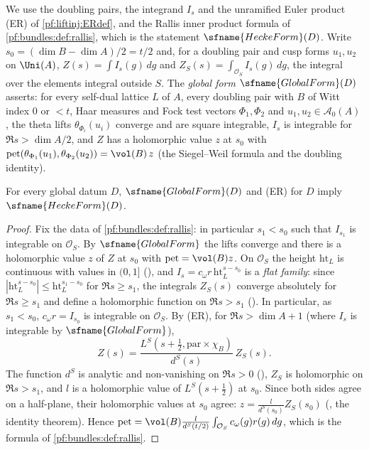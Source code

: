 We use the doubling pairs, the integrand $I_s$ and the unramified Euler product (ER) of \cref{pf:liftinj:ERdef}, and the Rallis
inner product formula of \cref{pf:bundles:def:rallis}, which is the statement $\sfname{HeckeForm}(D)$. Write
$s_0=(\dim B-\dim A)/2=t/2$ and, for a doubling pair and cusp forms $u_1,u_2$ on $\Uni(A)$, $Z(s)=\int I_s(g)\,dg$ and
$Z_{S}(s)=\int_{\mathcal O_S}I_s(g)\,dg$, the integral over the elements integral outside $S$. The \emph{global form}
$\sfname{GlobalForm}(D)$ asserts: for every self-dual lattice $L$ of $A$, every doubling pair with $B$ of Witt index $0$ or
$<t$, Haar measures and Fock test vectors $\Phi_1,\Phi_2$ and $u_1,u_2\in\mathcal A_0(A)$, the theta lifts $\theta_{\Phi_i}(u_i)$
converge and are square integrable, $I_s$ is integrable for $\Re s>\dim A/2$, and $Z$ has a holomorphic value $z$ at $s_0$ with
$\mathrm{pet}(\theta_{\Phi_1}(u_1),\theta_{\Phi_2}(u_2))=\vol(B)\,z$ (the Siegel--Weil formula and the doubling identity).

\begin{lemma}\label{pf:sh-theta:ipf}
For every global datum $D$, $\sfname{GlobalForm}(D)$ and (ER) for $D$ imply $\sfname{HeckeForm}(D)$.
\end{lemma}

\begin{proof}
Fix the data of \cref{pf:bundles:def:rallis}: in particular $s_1<s_0$ such that $I_{s_1}$ is integrable on $\mathcal O_S$. By
$\sfname{GlobalForm}$ the lifts converge and there is a holomorphic value $z$ of $Z$ at $s_0$ with $\mathrm{pet}=\vol(B)z$. On
$\mathcal O_S$ the height $\mathrm{ht}_L$ is continuous with values in $(0,1]$ (),
and $I_s=c_\omega r\,\mathrm{ht}_L^{s-s_0}$ is a \emph{flat family}: since $|\mathrm{ht}_L^{s-s_0}|\le\mathrm{ht}_L^{s_1-s_0}$ for
$\Re s\ge s_1$, the integrals $Z_S(s)$ converge absolutely for $\Re s\ge s_1$ and define a holomorphic function on $\Re s>s_1$
(). In particular, as $s_1<s_0$, $c_\omega r=I_{s_0}$ is integrable on
$\mathcal O_S$. By (ER), for $\Re s>\dim A+1$ (where $I_s$ is integrable by $\sfname{GlobalForm}$),
\[
Z(s)=\frac{L^S(s+\frac12,\mathrm{par}\times\chi_B)}{d^S(s)}\,Z_S(s).
\]
The function $d^S$ is analytic and non-vanishing on $\Re s>0$ (),
$Z_S$ is holomorphic on $\Re s>s_1$, and $l$ is a holomorphic value of $L^S(s+\frac12)$ at $s_0$. Since both sides agree on a
half-plane, their holomorphic values at $s_0$ agree: $z=\frac{l}{d^S(s_0)}Z_S(s_0)$
(, the identity theorem). Hence
$\mathrm{pet}=\vol(B)\frac{l}{d^S(t/2)}\int_{\mathcal O_S}c_\omega(g)r(g)\,dg$, which is the formula of \cref{pf:bundles:def:rallis}.
\end{proof}

